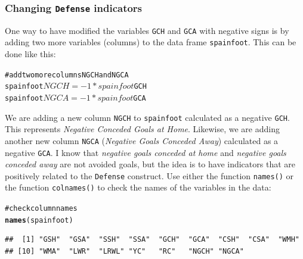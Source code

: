 \documentclass[12pt]{book}\usepackage{graphicx, color}
\makeatletter
\newcommand{\hlfunctioncall}[1]{\textcolor[rgb]{0.501960784313725,0,0.329411764705882}{\textbf{#1}}}%
\newcommand{\hlcomment}[1]{\textcolor[rgb]{0.180392156862745,0.6,0.341176470588235}{#1}}%
\newenvironment{kframe}{%
 \def\at@end@of@kframe{}%
 \ifinner\ifhmode%
  \def\at@end@of@kframe{\end{minipage}}%
  \begin{minipage}{\columnwidth}%
 \fi\fi%
 \def\FrameCommand##1{\hskip\@totalleftmargin \hskip-\fboxsep
 \colorbox{shadecolor}{##1}\hskip-\fboxsep
     \hskip-\linewidth \hskip-\@totalleftmargin \hskip\columnwidth}%
 \MakeFramed {\advance\hsize-\width
   \@totalleftmargin\z@ \linewidth\hsize
   \@setminipage}}%
 {\par\unskip\endMakeFramed%
 \at@end@of@kframe}
\newenvironment{knitrout}{}{} %
\newcommand{\code}[1]{\texttt{#1}}
\makeatother
\begin{document}
\subsubsection*{Changing \code{Defense} indicators}
One way to have modified the variables \code{GCH} and \code{GCA} with negative signs is by adding two more variables (columns) to the data frame \code{spainfoot}. This can be done like this: 
\begin{knitrout}
\color{fgcolor}\begin{kframe}
\begin{alltt}
\hlcomment{# add two more columns NGCH and NGCA}
spainfoot$NGCH = -1 * spainfoot$GCH
spainfoot$NGCA = -1 * spainfoot$GCA
\end{alltt}
\end{kframe}
\end{knitrout}

We are adding a new column \code{NGCH} to \code{spainfoot} calculated as a negative \code{GCH}. This represents \textit{Negative Conceded Goals at Home}. Likewise, we are adding another new column \code{NGCA} (\textit{Negative Goals Conceded Away}) calculated as a negative \code{GCA}. I know that \textit{negative goals conceded at home} and \textit{negative goals conceded away} are not avoided goals, but the idea is to have indicators that are positively related to the \code{Defense} construct. Use either the function \code{names()} or the function \code{colnames()} to check the names of the variables in the data:
\begin{knitrout}
\color{fgcolor}\begin{kframe}
\begin{alltt}
\hlcomment{# check column names}
\hlfunctioncall{names}(spainfoot)
\end{alltt}
\begin{verbatim}
##  [1] "GSH"  "GSA"  "SSH"  "SSA"  "GCH"  "GCA"  "CSH"  "CSA"  "WMH" 
## [10] "WMA"  "LWR"  "LRWL" "YC"   "RC"   "NGCH" "NGCA"
\end{verbatim}
\end{kframe}
\end{knitrout}
\end{document}
